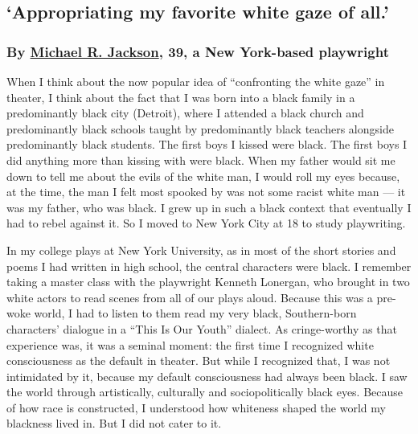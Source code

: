 \hypertarget{appropriating-my-favorite-white-gaze-of-all}{%
\subsection{`Appropriating my favorite white gaze of
all.'}\label{appropriating-my-favorite-white-gaze-of-all}}

\hypertarget{by-michael-r-jackson-39-a-new-york-based-playwright}{%
\subsubsection{\texorpdfstring{\textbf{By}
\textbf{\href{https://www.thelivingmichaeljackson.com/}{Michael R.
Jackson}, 39, a New York-based
playwright}}{By Michael R. Jackson, 39, a New York-based playwright}}\label{by-michael-r-jackson-39-a-new-york-based-playwright}}

When I think about the now popular idea of ``confronting the white
gaze'' in theater, I think about the fact that I was born into a black
family in a predominantly black city (Detroit), where I attended a black
church and predominantly black schools taught by predominantly black
teachers alongside predominantly black students. The first boys I kissed
were black. The first boys I did anything more than kissing with were
black. When my father would sit me down to tell me about the evils of
the white man, I would roll my eyes because, at the time, the man I felt
most spooked by was not some racist white man --- it was my father, who
was black. I grew up in such a black context that eventually I had to
rebel against it. So I moved to New York City at 18 to study
playwriting.

In my college plays at New York University, as in most of the short
stories and poems I had written in high school, the central characters
were black. I remember taking a master class with the playwright Kenneth
Lonergan, who brought in two white actors to read scenes from all of our
plays aloud. Because this was a pre-woke world, I had to listen to them
read my very black, Southern-born characters' dialogue in a ``This Is
Our Youth'' dialect. As cringe-worthy as that experience was, it was a
seminal moment: the first time I recognized white consciousness as the
default in theater. But while I recognized that, I was not intimidated
by it, because my default consciousness had always been black. I saw the
world through artistically, culturally and sociopolitically black eyes.
Because of how race is constructed, I understood how whiteness shaped
the world my blackness lived in. But I did not cater to it.

